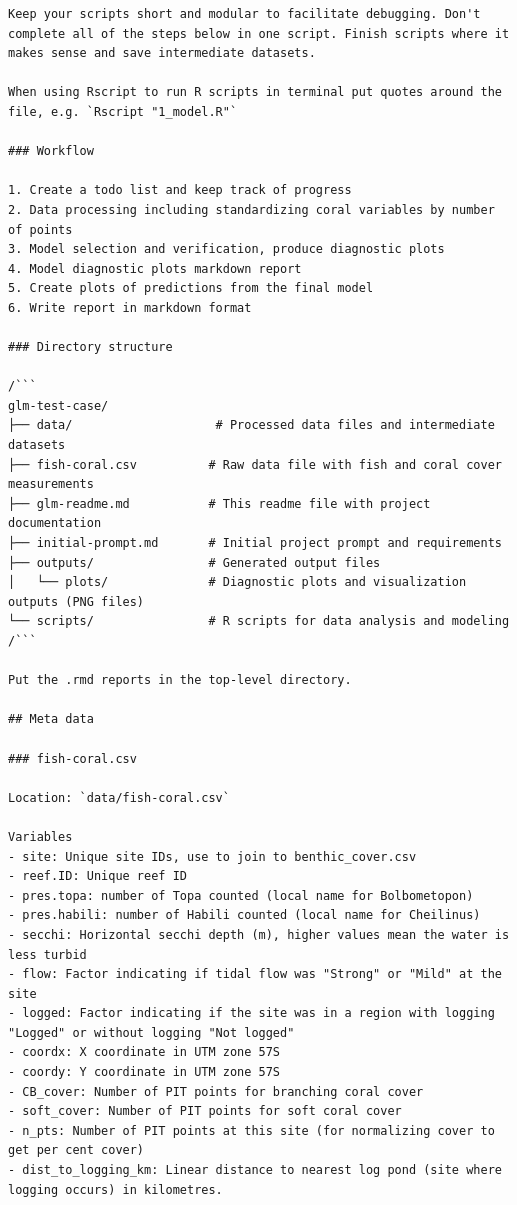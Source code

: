\documentclass[
  letterpaper,
  DIV=11,
  numbers=noendperiod]{scrreprt}
\begin{document}
\begin{verbatim}
Keep your scripts short and modular to facilitate debugging. Don't complete all of the steps below in one script. Finish scripts where it makes sense and save intermediate datasets. 

When using Rscript to run R scripts in terminal put quotes around the file, e.g. `Rscript "1_model.R"`

### Workflow 

1. Create a todo list and keep track of progress
2. Data processing including standardizing coral variables by number of points
3. Model selection and verification, produce diagnostic plots
4. Model diagnostic plots markdown report 
5. Create plots of predictions from the final model
6. Write report in markdown format

### Directory structure 

/```
glm-test-case/
├── data/                    # Processed data files and intermediate datasets
├── fish-coral.csv          # Raw data file with fish and coral cover measurements
├── glm-readme.md           # This readme file with project documentation
├── initial-prompt.md       # Initial project prompt and requirements
├── outputs/                # Generated output files
│   └── plots/              # Diagnostic plots and visualization outputs (PNG files)
└── scripts/                # R scripts for data analysis and modeling
/```

Put the .rmd reports in the top-level directory. 

## Meta data 

### fish-coral.csv

Location: `data/fish-coral.csv`

Variables
- site: Unique site IDs, use to join to benthic_cover.csv
- reef.ID: Unique reef ID
- pres.topa: number of Topa counted (local name for Bolbometopon)
- pres.habili: number of Habili counted (local name for Cheilinus) 
- secchi: Horizontal secchi depth (m), higher values mean the water is less turbid
- flow: Factor indicating if tidal flow was "Strong" or "Mild" at the site
- logged: Factor indicating if the site was in a region with logging "Logged" or without logging "Not logged"
- coordx: X coordinate in UTM zone 57S
- coordy: Y coordinate in UTM zone 57S
- CB_cover: Number of PIT points for branching coral cover
- soft_cover: Number of PIT points for soft coral cover
- n_pts: Number of PIT points at this site (for normalizing cover to get per cent cover)
- dist_to_logging_km: Linear distance to nearest log pond (site where logging occurs) in kilometres. 
\end{verbatim}
\end{document}
